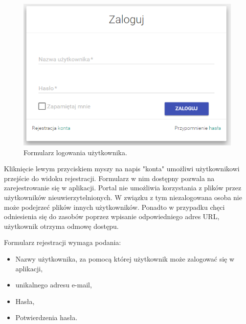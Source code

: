 \begin{figure}
	\centering
	\includegraphics[width=0.7\linewidth]{"obrazy/6..2 Logowanie"}
	\caption{Formularz logowania użytkownika.}
	\label{fig:6}
\end{figure}

Kliknięcie lewym przyciskiem myszy na napis "konta" umożliwi użytkownikowi przejście do widoku rejestracji. Formularz w nim dostępny pozwala na zarejestrowanie się w aplikacji. Portal nie umożliwia korzystania z plików przez użytkowników nieuwierzytelnionych. W związku z tym niezalogowana osoba nie może podejrzeć plików innych użytkowników. Ponadto w przypadku chęci odniesienia się do zasobów poprzez wpisanie odpowiedniego adres URL, użytkownik otrzyma odmowę dostępu. 

Formularz rejestracji wymaga podania:
\begin{itemize}  
	\item Nazwy użytkownika, za pomocą której użytkownik może zalogować się w aplikacji,
	\item unikalnego adresu e-mail,
	\item Hasła,
	\item Potwierdzenia hasła.
\end{itemize}


